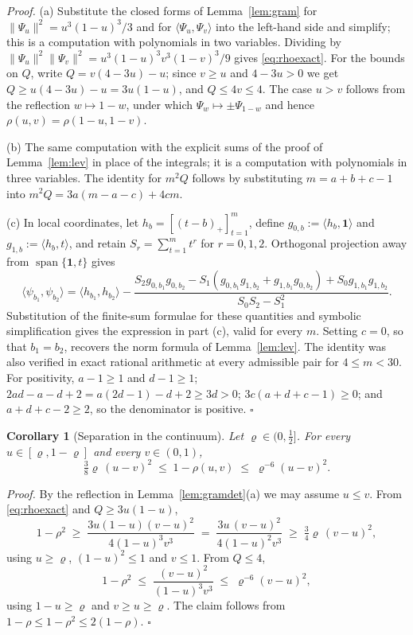 \documentclass[12pt, a4paper]{article}
\newcommand{\qed}{\hfill$\square$}
\newenvironment{proof}[1][Proof]{\par\noindent\textit{#1.}\space}{\qed\par\medskip}
\newtheorem{cor}{Corollary}[section]
\begin{document}
\begin{proof}
(a) Substitute the closed forms of Lemma~\ref{lem:gram} for
$\|\Psi_u\|^2 = u^3(1-u)^3/3$ and for $\langle\Psi_u,\Psi_v\rangle$ into
the left-hand side and simplify; this is a computation with polynomials in
two variables. Dividing by $\|\Psi_u\|^2\|\Psi_v\|^2 =
u^3(1-u)^3v^3(1-v)^3/9$ gives \eqref{eq:rhoexact}. For the bounds on $Q$,
write $Q = v(4-3u) - u$; since $v \ge u$ and $4-3u > 0$ we get
$Q \ge u(4-3u) - u = 3u(1-u)$, and $Q \le 4v \le 4$. The case $u > v$ follows
from the reflection $w \mapsto 1-w$, under which $\Psi_w \mapsto \pm\Psi_{1-w}$
and hence $\rho(u,v) = \rho(1-u,1-v)$.

(b) The same computation with the explicit sums of the proof of
Lemma~\ref{lem:lev} in place of the integrals; it is a computation with
polynomials in three variables. The identity for $m^2Q$ follows by substituting $m = a+b+c-1$ into $m^2Q = 3a(m-a-c)+4cm$.

(c) In local coordinates, let $h_b=[(t-b)_+]_{t=1}^m$, define
$g_{0,b}:=\langle h_b,\mathbf 1\rangle$ and
$g_{1,b}:=\langle h_b,t\rangle$, and retain
$S_r=\sum_{t=1}^m t^r$ for $r=0,1,2$. Orthogonal projection away from
$\operatorname{span}\{\mathbf 1,t\}$ gives
\[
\langle\psi_{b_1},\psi_{b_2}\rangle
=\langle h_{b_1},h_{b_2}\rangle-
\frac{S_2g_{0,b_1}g_{0,b_2}
-S_1(g_{0,b_1}g_{1,b_2}+g_{1,b_1}g_{0,b_2})
+S_0g_{1,b_1}g_{1,b_2}}{S_0S_2-S_1^2}.
\]
Substitution of the finite-sum formulae for these quantities and symbolic
simplification gives the expression in part (c), valid for every $m$. Setting
$c=0$, so that $b_1=b_2$, recovers the norm formula of
Lemma~\ref{lem:lev}. The identity was also verified in exact rational
arithmetic at every admissible pair for $4\le m<30$. For positivity,
$a-1\ge1$ and $d-1\ge1$;
$2ad-a-d+2=a(2d-1)-d+2\ge3d>0$;
$3c(a+d+c-1)\ge0$; and $a+d+c-2\ge2$, so the denominator is positive.
\end{proof}

\begin{cor}[Separation in the continuum]
\label{cor:sepcont}
Let $\varrho \in (0,\tfrac12]$. For every $u \in [\varrho, 1-\varrho]$ and
every $v \in (0,1)$,
\[
\tfrac38 \varrho \,(u-v)^2 \;\le\; 1 - \rho(u,v) \;\le\;
\varrho^{-6} (u-v)^2 .
\]
\end{cor}

\begin{proof}
By the reflection in Lemma~\ref{lem:gramdet}(a) we may assume $u \le v$. From
\eqref{eq:rhoexact} and $Q \ge 3u(1-u)$,
\[
1-\rho^2 \;\ge\; \frac{3u(1-u)(v-u)^2}{4(1-u)^3v^3}
\;=\; \frac{3u\,(v-u)^2}{4(1-u)^2v^3} \;\ge\; \tfrac34 \varrho\,(v-u)^2 ,
\]
using $u \ge \varrho$, $(1-u)^2 \le 1$ and $v \le 1$. From $Q \le 4$,
\[
1-\rho^2 \;\le\; \frac{(v-u)^2}{(1-u)^3 v^3} \;\le\;
\varrho^{-6}(v-u)^2 ,
\]
using $1-u \ge \varrho$ and $v \ge u \ge \varrho$. The claim follows from
$1-\rho \le 1-\rho^2 \le 2(1-\rho)$.
\end{proof}
\end{document}
